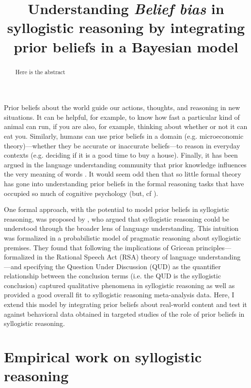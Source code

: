 \documentclass{article} %
\title{Understanding \emph{Belief bias} in syllogistic reasoning by integrating prior beliefs in a Bayesian model}
\begin{document}
\maketitle


\begin{abstract}
Here is the abstract
\end{abstract}

Prior beliefs about the world guide our actions, thoughts, and reasoning in new situations. It can be helpful, for example, to know how fast a particular kind of animal can run, if you are also, for example, thinking about whether or not it can eat you. Similarly, humans can use prior beliefs in a domain (e.g. microeconomic theory)---whether they be accurate or inaccurate beliefs---to reason in everyday contexts  (e.g. deciding if it is a good time to buy a house). Finally, it has been argued in the language understanding community that prior knowledge influences the very meaning of words \cite{LassGood2015}. It would seem odd then that so little formal theory has gone into understanding prior beliefs in the formal reasoning tasks that have occupied so much of cognitive psychology (but, cf ). 

One formal approach, with the potential to model prior beliefs in syllogistic reasoning, was proposed by , who argued that syllogistic reasoning could be understood through the broader lens of language understanding. This intuition was formalized in a probabilistic model of pragmatic reasoning about syllogistic premises. They found that following the implications of Gricean principles---formalized in the Rational Speech Act (RSA) theory of language understanding \cite{Frank2012,Goodman2013}---and specifying the Question Under Discussion \cite{Roberts2004} (QUD) as the quantifier relationship between the conclusion terms (i.e. the QUD is the syllogistic conclusion) captured qualitative phenomena in syllogistic reasoning as well as provided a good overall fit to syllogistic reasoning meta-analysis data. Here, I extend this model by integrating prior beliefs about real-world content and test it against behavioral data obtained in targeted studies of the role of prior beliefs in syllogistic reasoning.

\section{Empirical work on syllogistic reasoning}
\end{document}
